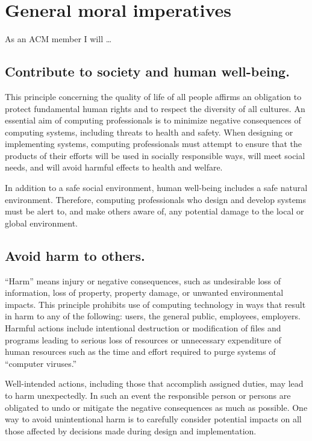 \documentclass{article}
\begin{document}
\section{General moral imperatives}

As an ACM member I will \ldots

\subsection{Contribute to society and human well-being.}

This principle concerning the quality of life of all people affirms an
obligation to protect fundamental human rights and to respect the diversity of
all cultures. An essential aim of computing professionals is to minimize
negative consequences of computing systems, including threats to health and
safety. When designing or implementing systems, computing professionals must
attempt to ensure that the products of their efforts will be used in socially
responsible ways, will meet social needs, and will avoid harmful effects to
health and welfare.

In addition to a safe social environment, human well-being includes a safe
natural environment. Therefore, computing professionals who design and develop
systems must be alert to, and make others aware of, any potential damage to the
local or global environment.

\subsection{Avoid harm to others.}

``Harm'' means injury or negative consequences, such as undesirable loss of
information, loss of property, property damage, or unwanted environmental
impacts. This principle prohibits use of computing technology in ways that
result in harm to any of the following: users, the general public, employees,
employers. Harmful actions include intentional destruction or modification of
files and programs leading to serious loss of resources or unnecessary
expenditure of human resources such as the time and effort required to purge
systems of ``computer viruses.''

Well-intended actions, including those that accomplish assigned duties, may
lead to harm unexpectedly. In such an event the responsible person or persons
are obligated to undo or mitigate the negative consequences as much as
possible. One way to avoid unintentional harm is to carefully consider
potential impacts on all those affected by decisions made during design and
implementation.
\end{document}
